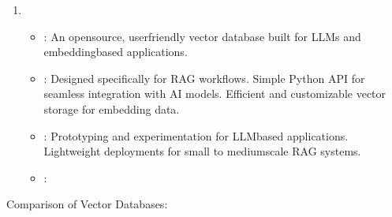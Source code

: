 \documentclass[letterpaper,11pt,english]{sphinxmanual}
\begin{document}
\begin{enumerate}
\begin{itemize}
\item {} 
\sphinxAtStartPar
{}:
\sphinxhyphen{} Combines vector search with advanced ranking and filtering.
\sphinxhyphen{} Scales to large datasets with support for distributed clusters.
\sphinxhyphen{} Powerful query configuration options.

\item {} 
\sphinxAtStartPar
{}:
\sphinxhyphen{} E\sphinxhyphen{}commerce and recommendation systems.
\sphinxhyphen{} Applications with complex ranking requirements.

\item {} 
\sphinxAtStartPar
{}: 

\end{itemize}

\item {} 
\sphinxAtStartPar
{}
\begin{itemize}
\item {} 
\sphinxAtStartPar
{}:
\sphinxhyphen{} An open\sphinxhyphen{}source, user\sphinxhyphen{}friendly vector database built for LLMs and embedding\sphinxhyphen{}based applications.

\item {} 
\sphinxAtStartPar
{}:
\sphinxhyphen{} Designed specifically for RAG workflows.
\sphinxhyphen{} Simple Python API for seamless integration with AI models.
\sphinxhyphen{} Efficient and customizable vector storage for embedding data.

\item {} 
\sphinxAtStartPar
{}:
\sphinxhyphen{} Prototyping and experimentation for LLM\sphinxhyphen{}based applications.
\sphinxhyphen{} Lightweight deployments for small to medium\sphinxhyphen{}scale RAG systems.

\item {} 
\sphinxAtStartPar
{}: 

\end{itemize}

\end{enumerate}

\sphinxAtStartPar
Comparison of Vector Databases:
\end{document}
